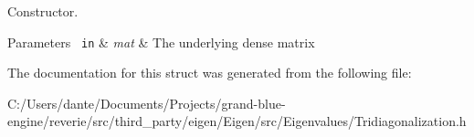 Constructor. 


\begin{DoxyParams}[1]{Parameters}
\mbox{\texttt{ in}}  & {\em mat} & The underlying dense matrix \\
\hline
\end{DoxyParams}


The documentation for this struct was generated from the following file\+:\begin{DoxyCompactItemize}
\item 
C\+:/\+Users/dante/\+Documents/\+Projects/grand-\/blue-\/engine/reverie/src/third\+\_\+party/eigen/\+Eigen/src/\+Eigenvalues/Tridiagonalization.\+h\end{DoxyCompactItemize}

